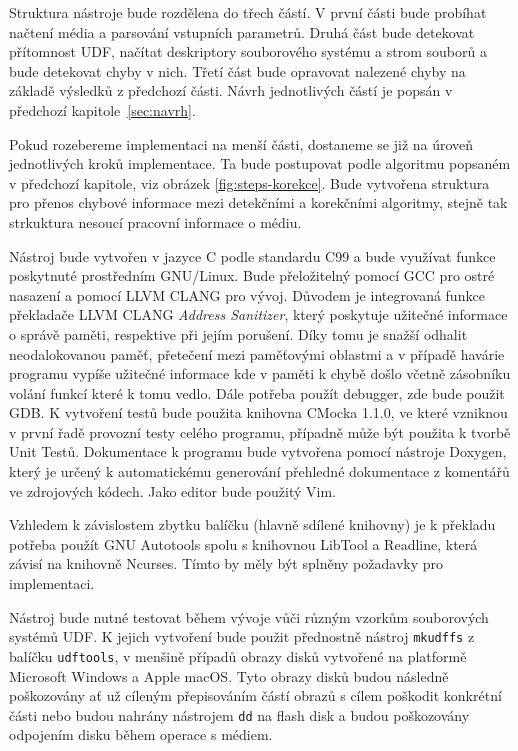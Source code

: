 Struktura nástroje bude rozdělena do třech částí. V první části bude probíhat načtení média a parsování vstupních parametrů. Druhá část bude detekovat přítomnost UDF, načítat deskriptory souborového systému a strom souborů a bude detekovat chyby v nich. Třetí část bude opravovat nalezené chyby na základě výsledků z předchozí části. Návrh jednotlivých částí je popsán v předchozí kapitole~\ref{sec:navrh}.

Pokud rozebereme implementaci na menší části, dostaneme se již na úroveň jednotlivých kroků implementace. Ta bude postupovat podle algoritmu popsaném v předchozí kapitole, viz obrázek \ref{fig:steps-korekce}. Bude vytvořena struktura pro přenos chybové informace mezi detekčními a korekčními algoritmy, stejně tak strkuktura nesoucí pracovní informace o médiu. 

Nástroj bude vytvořen v jazyce C podle standardu C99 a bude využívat funkce poskytnuté prostředním GNU/Linux. Bude přeložitelný pomocí GCC pro ostré nasazení a pomocí LLVM CLANG pro vývoj. Důvodem je integrovaná funkce překladače LLVM CLANG \textit{Address Sanitizer}, který poskytuje užitečné informace o správě paměti, respektive při jejím porušení. Díky tomu je snažší odhalit neodalokovanou paměť, přetečení mezi paměťovými oblastmi a v případě havárie programu vypíše užitečné informace kde v paměti k chybě došlo včetně zásobníku volání funkcí které k tomu vedlo. Dále potřeba použít debugger, zde bude použit GDB. K vytvoření testů bude použita knihovna CMocka 1.1.0, ve které vzniknou v první řadě provozní testy celého programu, případně může být použita k tvorbě Unit Testů. Dokumentace k programu bude vytvořena pomocí nástroje Doxygen, který je určený k automatickému generování přehledné dokumentace z komentářů ve zdrojových kódech. Jako editor bude použitý Vim.

Vzhledem k závislostem zbytku balíčku (hlavně sdílené knihovny) je k překladu potřeba použít GNU Autotools spolu s knihovnou LibTool a Readline, která závisí na knihovně Ncurses. Tímto by měly být splněny požadavky pro implementaci.

Nástroj bude nutné testovat během vývoje vůči různým vzorkům souborových systémů UDF. K jejich vytvoření bude použit přednostně nástroj \texttt{mkudffs} z balíčku \texttt{udftools}, v menšině případů obrazy disků vytvořené na platformě Microsoft Windows a Apple macOS. Tyto obrazy disků budou následně poškozovány ať už cíleným přepisováním částí obrazů s cílem poškodit konkrétní části nebo budou nahrány nástrojem \texttt{dd} na flash disk a budou poškozovány odpojením disku během operace s médiem.

